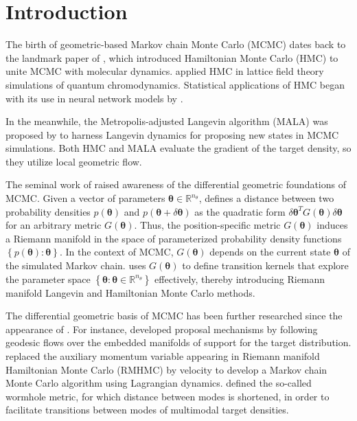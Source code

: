 \documentclass[twoside,11pt]{article}
\begin{document}
\section{Introduction}

The birth of geometric-based Markov chain Monte Carlo (MCMC) dates back to the landmark paper of \cite{dua_ken_pen__hyb},
which introduced Hamiltonian Monte Carlo (HMC) to unite MCMC with molecular dynamics.
\cite{dua_ken_pen__hyb} applied HMC in lattice field theory simulations of quantum chromodynamics.
Statistical applications of HMC began with its use in neural network models by \cite{nea__bay}.

In the meanwhile, the Metropolis-adjusted Langevin algorithm (MALA) was proposed by \cite{rob_ros__opt} to harness Langevin 
dynamics for proposing new states in MCMC simulations. Both HMC and MALA evaluate the gradient of the target density, so 
they utilize local geometric flow.

The seminal work of \cite{gir_cal__rie} raised awareness of the differential geometric foundations of MCMC. Given a vector 
of parameters $\boldsymbol{\theta}\in\mathbb{R}^{n_\theta}$, \cite{gir_cal__rie} defines a distance between two probability 
densities $p(\boldsymbol{\theta})$ and $p(\boldsymbol{\theta}+\delta\boldsymbol{\theta})$ as the quadratic form
$\delta\boldsymbol{\theta}^T G(\boldsymbol{\theta}) \delta\boldsymbol{\theta}$ for an arbitrary metric 
$G(\boldsymbol{\theta})$. Thus, the position-specific metric $G(\boldsymbol{\theta})$ induces a Riemann manifold in the 
space of parameterized probability density functions $\left\{p(\boldsymbol{\theta}):\boldsymbol{\theta}\right\}$.
In the context of MCMC, $G(\boldsymbol{\theta})$ depends on the current state $\boldsymbol{\theta}$ of the simulated Markov 
chain. \cite{gir_cal__rie} uses $G(\boldsymbol{\theta})$ to define transition kernels that explore the parameter space
$\left\{\boldsymbol{\theta}:\boldsymbol{\theta}\in\mathbb{R}^{n_\theta}\right\}$ effectively, thereby introducing Riemann 
manifold Langevin and Hamiltonian Monte Carlo methods.

The differential geometric basis of MCMC has been further researched since the appearance of \cite{gir_cal__rie}. For 
instance, \cite{byr_gir__geo} developed proposal mechanisms by following geodesic flows over the embedded manifolds of 
support for the target distribution. \cite{lan_sta_sha__mar} replaced the auxiliary momentum variable appearing in Riemann 
manifold Hamiltonian Monte Carlo (RMHMC) by velocity to develop a Markov chain Monte Carlo algorithm using Lagrangian 
dynamics. \cite{lan_str_sha__wor} defined the so-called wormhole metric, for which distance between modes is shortened, in 
order to facilitate transitions between modes of multimodal target densities.
\end{document}
